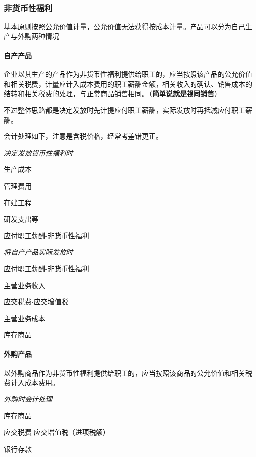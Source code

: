 \documentclass[UTF8,12pt]{ctexart}
\newenvironment{Dr}{%
	\begin{list}{}%
		{
			\setlength{\leftmargin}{2em}
			\setlength{\labelwidth}{2em}
			\setlength{\labelsep}{0pt}
			\setlength{\itemindent}{0pt}
			\setlength{\listparindent}{0pt}
			\setlength{\parsep}{0pt}
			\setlength{\topsep}{0pt}
		}
		\item[\textbf{借：}]
	}{%
	\end{list}
}
\newenvironment{Cr}{%
	\begin{list}{}%
		{
			\setlength{\leftmargin}{3em}
			\setlength{\labelwidth}{2em}
			\setlength{\labelsep}{0pt}
			\setlength{\itemindent}{0pt}
			\setlength{\listparindent}{0pt}
			\setlength{\parsep}{0pt}
			\setlength{\topsep}{0pt}
		}
		\item[\textbf{贷：}]
	}{%
	\end{list}
}
\numberwithin{equation}{section} %
\numberwithin{figure}{section}
\numberwithin{table}{section}
\begin{document}
	\subsubsection{非货币性福利}
	基本原则按照公允价值计量，公允价值无法获得按成本计量。产品可以分为自己生产与外购两种情况
	
	\paragraph{自产产品}
	企业以其生产的产品作为非货币性福利提供给职工的，应当按照该产品的公允价值和相关税费，计量应计入成本费用的职工薪酬金额，相关收入的确认、销售成本的结转和相关税费的处理，与正常商品销售相同。（\textbf{简单说就是视同销售}）
	
	不过整体思路都是决定发放时先计提应付职工薪酬，实际发放时再抵减应付职工薪酬。
	
	会计处理如下，注意是含税价格，经常考差错更正。
	
	\textit{决定发放货币性福利时}
	
	\begin{Dr}
		生产成本
		
		管理费用
		
		在建工程
		
		研发支出等
	\end{Dr}
	\begin{Cr}
		应付职工薪酬-非货币性福利
	\end{Cr}
	
	\textit{将自产产品实际发放时}
	
	\begin{Dr}
		应付职工薪酬-非货币性福利
	\end{Dr}
	\begin{Cr}
		主营业务收入
		
		应交税费-应交增值税
	\end{Cr}

	\begin{Dr}
		主营业务成本
	\end{Dr}
	\begin{Cr}
		库存商品
	\end{Cr}

	\paragraph{外购产品}
	以外购商品作为非货币性福利提供给职工的，应当按照该商品的公允价值和相关税费计入成本费用。
	
	\textit{外购时会计处理}
	
	\begin{Dr}
		库存商品
		
		应交税费-应交增值税（进项税额）
	\end{Dr}
	\begin{Cr}
		银行存款
	\end{Cr}
	
\end{document}
